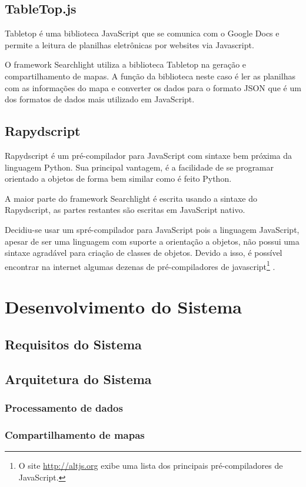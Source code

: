 \subsection{TableTop.js}

Tabletop\cite{tabletop} é uma biblioteca JavaScript que se comunica com o Google Docs e permite a leitura de planilhas eletrônicas por websites via Javascript. 

O framework Searchlight utiliza a biblioteca Tabletop na geração e compartilhamento de mapas. A função da biblioteca neste caso é ler as planilhas com as informações do mapa e converter os dados para o formato JSON que é um dos formatos de dados mais utilizado em JavaScript.


\subsection{Rapydscript}

Rapydscript \cite{rapydscript} é um pré-compilador para JavaScript com sintaxe bem próxima da linguagem Python. Sua principal vantagem, é a facilidade de se programar orientado a objetos de forma bem similar como é feito Python. 

A maior parte do framework Searchlight é escrita usando a sintaxe do Rapydscript, as partes restantes são escritas em JavaScript nativo.

Decidiu-se usar um spré-compilador para JavaScript pois a linguagem JavaScript, apesar de ser uma linguagem com suporte a orientação a objetos, não possui uma sintaxe agradável para criação de classes de objetos. Devido a isso, é possível encontrar na internet algumas dezenas de pré-compiladores de javascript\footnote{O site \url{http://altjs.org} exibe uma lista dos principais pré-compiladores de JavaScript.}
. 

\section{Desenvolvimento do Sistema}
\subsection{Requisitos do Sistema}
\subsection{Arquitetura do Sistema}
	\subsubsection{Processamento de dados}
	\subsubsection{Compartilhamento de mapas}

